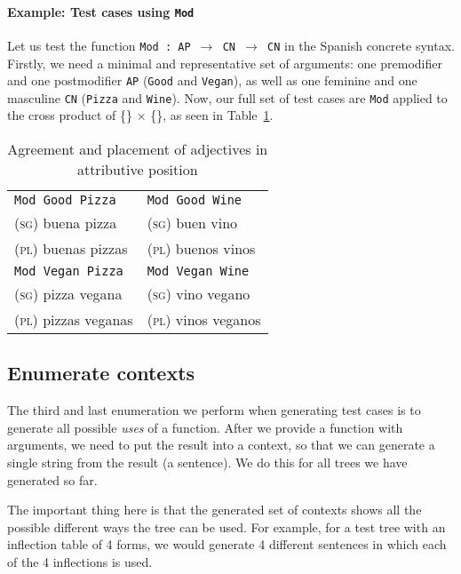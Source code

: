 \documentclass[11pt]{article}
\def\t#1{\texttt{#1}}
\begin{document}
\paragraph{Example: Test cases using \t{Mod}} Let us test the function
\t{Mod : AP $\rightarrow$ CN $\rightarrow$ CN} in the Spanish
concrete syntax.
Firstly, we need a minimal and representative set of arguments:
one premodifier and one postmodifier \t{AP} (\t{Good} and
\t{Vegan}), as well as one feminine and one masculine
\t{CN} (\t{Pizza} and \t{Wine}). Now, our full set of test cases are
\t{Mod} applied to the cross product of \{\} $\times$ \{\}, as seen in Table~\ref{tab:adjAttr}.

\begin{table}[h]
\centering
\begin{tabular}{| l | l |}
\hline
\t{Mod Good Pizza}   & \t{Mod Good Wine} \\ 
\textsc{(sg)} buena pizza             & \textsc{(sg)} buen vino \\
\textsc{(pl)} buenas pizzas           & \textsc{(pl)} buenos vinos \\ \hline

\t{Mod Vegan Pizza}   & \t{Mod Vegan Wine} \\ 
\textsc{(sg)} pizza vegana            & \textsc{(sg)} vino vegano \\
\textsc{(pl)} pizzas veganas          & \textsc{(pl)} vinos veganos \\ \hline
\end{tabular}
\caption{Agreement and placement of adjectives in attributive position}
\label{tab:adjAttr}
\end{table}

\subsection{Enumerate contexts} The third and last enumeration we
perform when generating test cases is to generate all possible
\emph{uses} of a function. After we provide a function with arguments,
we need to put the result into a context, so that we can generate a
single string from the result (a sentence). We do this for all trees
we have generated so far. 

The important thing here is that the generated set of contexts shows
all the possible different ways the tree can be used. For example, for
a test tree with an inflection table of 4 forms, we would generate 4 different sentences in which each of the 4 inflections is used.
\end{document}
